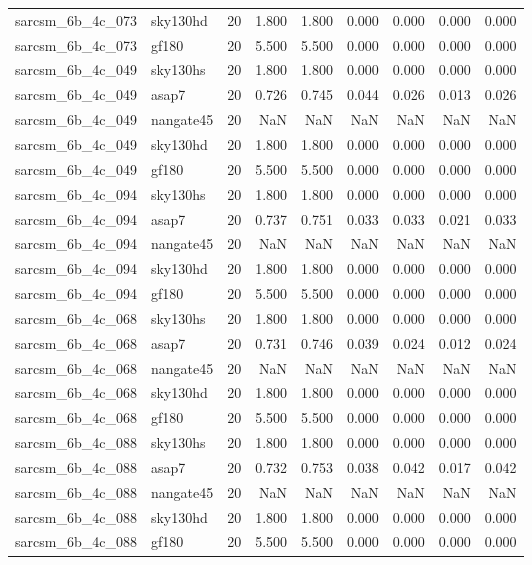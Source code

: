 \begin{tabular}{llrrrrrrr}
sarcsm\_6b\_4c\_073 & sky130hd & 20 & 1.800 & 1.800 & 0.000 & 0.000 & 0.000 & 0.000 \\
sarcsm\_6b\_4c\_073 & gf180 & 20 & 5.500 & 5.500 & 0.000 & 0.000 & 0.000 & 0.000 \\
sarcsm\_6b\_4c\_049 & sky130hs & 20 & 1.800 & 1.800 & 0.000 & 0.000 & 0.000 & 0.000 \\
sarcsm\_6b\_4c\_049 & asap7 & 20 & 0.726 & 0.745 & 0.044 & 0.026 & 0.013 & 0.026 \\
sarcsm\_6b\_4c\_049 & nangate45 & 20 & NaN & NaN & NaN & NaN & NaN & NaN \\
sarcsm\_6b\_4c\_049 & sky130hd & 20 & 1.800 & 1.800 & 0.000 & 0.000 & 0.000 & 0.000 \\
sarcsm\_6b\_4c\_049 & gf180 & 20 & 5.500 & 5.500 & 0.000 & 0.000 & 0.000 & 0.000 \\
sarcsm\_6b\_4c\_094 & sky130hs & 20 & 1.800 & 1.800 & 0.000 & 0.000 & 0.000 & 0.000 \\
sarcsm\_6b\_4c\_094 & asap7 & 20 & 0.737 & 0.751 & 0.033 & 0.033 & 0.021 & 0.033 \\
sarcsm\_6b\_4c\_094 & nangate45 & 20 & NaN & NaN & NaN & NaN & NaN & NaN \\
sarcsm\_6b\_4c\_094 & sky130hd & 20 & 1.800 & 1.800 & 0.000 & 0.000 & 0.000 & 0.000 \\
sarcsm\_6b\_4c\_094 & gf180 & 20 & 5.500 & 5.500 & 0.000 & 0.000 & 0.000 & 0.000 \\
sarcsm\_6b\_4c\_068 & sky130hs & 20 & 1.800 & 1.800 & 0.000 & 0.000 & 0.000 & 0.000 \\
sarcsm\_6b\_4c\_068 & asap7 & 20 & 0.731 & 0.746 & 0.039 & 0.024 & 0.012 & 0.024 \\
sarcsm\_6b\_4c\_068 & nangate45 & 20 & NaN & NaN & NaN & NaN & NaN & NaN \\
sarcsm\_6b\_4c\_068 & sky130hd & 20 & 1.800 & 1.800 & 0.000 & 0.000 & 0.000 & 0.000 \\
sarcsm\_6b\_4c\_068 & gf180 & 20 & 5.500 & 5.500 & 0.000 & 0.000 & 0.000 & 0.000 \\
sarcsm\_6b\_4c\_088 & sky130hs & 20 & 1.800 & 1.800 & 0.000 & 0.000 & 0.000 & 0.000 \\
sarcsm\_6b\_4c\_088 & asap7 & 20 & 0.732 & 0.753 & 0.038 & 0.042 & 0.017 & 0.042 \\
sarcsm\_6b\_4c\_088 & nangate45 & 20 & NaN & NaN & NaN & NaN & NaN & NaN \\
sarcsm\_6b\_4c\_088 & sky130hd & 20 & 1.800 & 1.800 & 0.000 & 0.000 & 0.000 & 0.000 \\
sarcsm\_6b\_4c\_088 & gf180 & 20 & 5.500 & 5.500 & 0.000 & 0.000 & 0.000 & 0.000 \\

\end{tabular}
